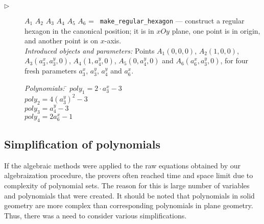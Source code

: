 \documentclass[final,1p,times,authoryear]{elsarticle}
\begin{document}
\begin{description}
\item[$\triangleright$] $A_1$ $A_2$ $A_3$ $A_4$ $A_5$ $A_6$ = {\tt
    make\_regular\_hexagon} --- construct a regular hexagon in the
  canonical position; it is in $xOy$ plane, one point is in origin,
  and another
  point is on $x$-axis. \\
  {\em Introduced objects and parameters:} Points $A_1(0, 0, 0)$,
  $A_2(1, 0, 0)$, $A_3(a_3^x, a_3^y, 0)$, $A_4(1, a_4^y, 0)$,
  $A_5(0, a_4^y, 0)$ and $A_6(a_6^x, a_3^y, 0)$, for four fresh
  parameters $a_3^x$, $a_3^y$, $a_4^y$ and $a_6^x$.

\begin{tabbing}
{\em Polynomials:} \= $poly_1 = 2\cdot a_3^x - 3$ \\
                   \> $poly_2 = 4(a_3^y)^2 - 3$ \\
                   \> $poly_3 = a_4^y - 3$ \\
                   \> $poly_4 = 2a_6^x - 1$
\end{tabbing}
\end{description}



\subsection{Simplification of polynomials}
\label{simplification}

If the algebraic methods were applied to the raw equations obtained by
our algebraization procedure, the provers often reached time and space
limit due to complexity of polynomial sets. The reason for this is
large number of variables and polynomials that were created. It should
be noted that polynomials in solid geometry are more complex than
corresponding polynomials in plane geometry. Thus, there was a need to
consider various simplifications.
\end{document}
